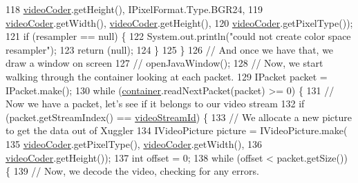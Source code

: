 \begin{DoxyCode}
118                     \hyperlink{classworkspace_1_1_a_r_drone_capture_image_1_1src_1_1_display_camera_image_a13aa4bcc23766e6bac7e49ea7c882019}{videoCoder}.getHeight(), IPixelFormat.Type.BGR24,
119                     \hyperlink{classworkspace_1_1_a_r_drone_capture_image_1_1src_1_1_display_camera_image_a13aa4bcc23766e6bac7e49ea7c882019}{videoCoder}.getWidth(), \hyperlink{classworkspace_1_1_a_r_drone_capture_image_1_1src_1_1_display_camera_image_a13aa4bcc23766e6bac7e49ea7c882019}{videoCoder}.getHeight(),
120                     \hyperlink{classworkspace_1_1_a_r_drone_capture_image_1_1src_1_1_display_camera_image_a13aa4bcc23766e6bac7e49ea7c882019}{videoCoder}.getPixelType());
121             \textcolor{keywordflow}{if} (resampler == null) \{
122                 System.out.println(\textcolor{stringliteral}{"could not create color space resampler"});
123                 \textcolor{keywordflow}{return} (null);
124             \}
125         \}
126         \textcolor{comment}{// And once we have that, we draw a window on screen}
127         \textcolor{comment}{// openJavaWindow();}
128         \textcolor{comment}{// Now, we start walking through the container looking at each packet.}
129         IPacket packet = IPacket.make();
130         \textcolor{keywordflow}{while} (\hyperlink{classworkspace_1_1_a_r_drone_capture_image_1_1src_1_1_display_camera_image_ad5078e38667c841c5c1d4541741fe5a9}{container}.readNextPacket(packet) >= 0) \{
131             \textcolor{comment}{// Now we have a packet, let's see if it belongs to our video stream}
132             \textcolor{keywordflow}{if} (packet.getStreamIndex() == \hyperlink{classworkspace_1_1_a_r_drone_capture_image_1_1src_1_1_display_camera_image_aa2f5d378f7aa31734eb27fc38ed672f6}{videoStreamId}) \{
133                 \textcolor{comment}{// We allocate a new picture to get the data out of Xuggler}
134                 IVideoPicture picture = IVideoPicture.make(
135                         \hyperlink{classworkspace_1_1_a_r_drone_capture_image_1_1src_1_1_display_camera_image_a13aa4bcc23766e6bac7e49ea7c882019}{videoCoder}.getPixelType(), \hyperlink{classworkspace_1_1_a_r_drone_capture_image_1_1src_1_1_display_camera_image_a13aa4bcc23766e6bac7e49ea7c882019}{videoCoder}.getWidth(),
136                         \hyperlink{classworkspace_1_1_a_r_drone_capture_image_1_1src_1_1_display_camera_image_a13aa4bcc23766e6bac7e49ea7c882019}{videoCoder}.getHeight());
137                 \textcolor{keywordtype}{int} offset = 0;
138                 \textcolor{keywordflow}{while} (offset < packet.getSize()) \{
139                     \textcolor{comment}{// Now, we decode the video, checking for any errors.}

\end{DoxyCode}
